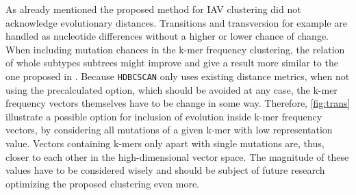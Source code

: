 As already mentioned the proposed method for \gls{IAV} clustering did not acknowledge evolutionary distances. Transitions and transversion for example are handled as nucleotide differences without a higher or lower chance of change. When including mutation chances in the k-mer frequency clustering, the relation of whole subtypes subtrees might improve and give a result more similar to the one proposed in \textcite{wei_next-generation_2020}. Because \texttt{HDBCSCAN} only uses existing distance metrics, when not using the precalculated option, which should be avoided at any case, the k-mer frequency vectors themselves have to be change in some way. Therefore, \autoref{fig:trans} illustrate a possible option for inclusion of evolution inside k-mer frequency vectors, by considering all mutations of a given k-mer with low representation value. Vectors containing k-mers only apart with single mutations are, thus, closer to each other in the high-dimensional vector space. The magnitude of these values have to be considered wisely and should be subject of future research optimizing the proposed clustering even more.